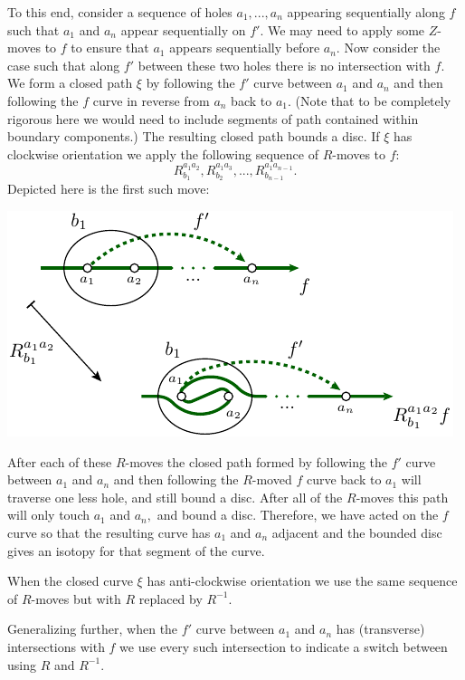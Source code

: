 \documentclass[aps, prl, letterpaper, twocolumn, superscriptaddress, notitlepage, 10pt]{revtex4-1}
\begin{document}
To this end, consider a sequence of holes $a_1,...,a_n$
appearing sequentially along $f$
such that $a_1$ and $a_n$ appear sequentially on $f'.$
We may need to apply some $Z$-moves to $f$ to ensure
that $a_1$ appears sequentially before $a_n$.
Now consider the case such that
along $f'$ between these two holes there is
no intersection with $f.$
We form a closed path $\xi$ by
following the $f'$ curve between $a_1$ and $a_n$ and then
following the $f$ curve in reverse from $a_n$ back to $a_1.$
(Note that to be completely rigorous here we would need to include segments
of path contained within boundary components.)
The resulting closed path bounds a disc.
If $\xi$ has clockwise orientation 
we apply the following sequence of $R$-moves to $f$:
$$
    R^{a_1a_2}_{b_1}, R^{a_1a_3}_{b_2}, ..., R^{a_1a_{n-1}}_{b_{n-1}}.
$$
Depicted here is the first such move:
\begin{center}
\includegraphics[]{pic-theorem.pdf}
\end{center}
After each of these $R$-moves the closed path
formed by 
following the $f'$ curve between $a_1$ and $a_n$ and then
following the $R$-moved $f$ curve back to $a_1$ will
traverse one less hole, and still bound a disc.
After all of the $R$-moves this path will only
touch $a_1$ and $a_n,$ and bound a disc.
Therefore, we have acted on the $f$ curve so that
the resulting curve has $a_1$ and $a_n$ adjacent
and the bounded disc gives an isotopy for that
segment of the curve.

When the closed curve $\xi$ has anti-clockwise orientation
we use the same sequence of $R$-moves but with $R$ replaced by $R^{-1}.$

Generalizing further,
when the $f'$ curve between $a_1$ and $a_n$ has (transverse) intersections
with $f$ we use every such intersection to indicate a switch
between using $R$ and $R^{-1}.$

\end{document}

